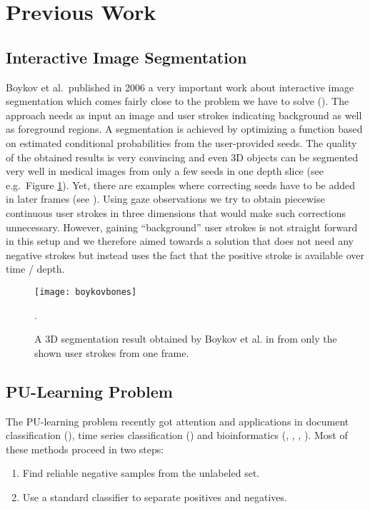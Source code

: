 \section{Previous Work}
\subsection{Interactive Image Segmentation}
Boykov et al.\ published in 2006 a very important work about interactive image segmentation which comes fairly close to the problem we have to solve (\cite{boykov2006graph}). 
The approach needs as input an image and user strokes indicating background as well as foreground regions. 
A segmentation is achieved by optimizing a function based on estimated conditional probabilities from the user-provided seeds. 
The quality of the obtained results is very convincing and even 3D objects can be segmented very well in medical images from only a few seeds in one depth slice (see e.g.\ Figure \ref{fig:boykovbones}). 
Yet, there are examples where correcting seeds have to be added in later frames (see \cite[Section~Experimental Results]{boykov2006graph}). 
Using gaze observations we try to obtain piecewise continuous user strokes in three dimensions that would make such corrections unnecessary. However, gaining ``background'' user strokes is not straight forward in this setup and we therefore aimed towards a solution that does not need any negative strokes but instead uses the fact that the positive stroke is available over time / depth.

\begin{figure}[ht]
	\centering
	\texttt{[image: boykovbones]}
	\caption{A 3D segmentation result obtained by Boykov et al. in \cite{boykov2006graph} from only the shown user strokes from one frame.}.
	\label{fig:boykovbones}
\end{figure}

\subsection{PU-Learning Problem}
The PU-learning problem recently got attention and applications in document classification (\cite{li2003learning}), time series classification (\cite{nguyen2011positive}) and bioinformatics (\cite{elkan2008learning}, \cite{yang2012positive}, \cite{yang2014ensemble}, \cite{yousef2015novel}). 
Most of these methods proceed in two steps: 
\begin{enumerate}
 \item Find reliable negative samples from the unlabeled set.
 \item Use a standard classifier to separate positives and negatives.
\end{enumerate}

